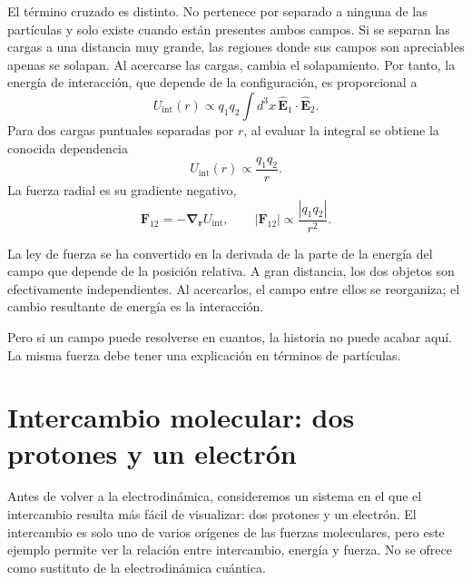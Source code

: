 El término cruzado es distinto. No pertenece por separado a ninguna de las partículas y solo existe cuando están presentes ambos campos. Si se separan las cargas a una distancia muy grande, las regiones donde sus campos son apreciables apenas se solapan. Al acercarse las cargas, cambia el solapamiento. Por tanto, la energía de interacción, que depende de la configuración, es proporcional a
\begin{equation}
U_{\text{int}}(r)\propto q_1q_2\int d^3x\,
\widehat{\mathbf E}_1\!\cdot\!\widehat{\mathbf E}_2.
\end{equation}
Para dos cargas puntuales separadas por \(r\), al evaluar la integral se obtiene la conocida dependencia
\begin{equation}
U_{\text{int}}(r)\propto\frac{q_1q_2}{r}.
\end{equation}
La fuerza radial es su gradiente negativo,
\begin{equation}
\mathbf F_{12}=-\boldsymbol\nabla_{\mathbf r}U_{\text{int}},
\qquad
|\mathbf F_{12}|\propto\frac{|q_1q_2|}{r^2}.
\end{equation}

La ley de fuerza se ha convertido en la derivada de la parte de la energía del campo que depende de la posición relativa. A gran distancia, los dos objetos son efectivamente independientes. Al acercarlos, el campo entre ellos se reorganiza; el cambio resultante de energía es la interacción.

Pero si un campo puede resolverse en cuantos, la historia no puede acabar aquí. La misma fuerza debe tener una explicación en términos de partículas.

\section{Intercambio molecular: dos protones y un electrón}

Antes de volver a la electrodinámica, consideremos un sistema en el que el intercambio resulta más fácil de visualizar: dos protones y un electrón. El intercambio es solo uno de varios orígenes de las fuerzas moleculares, pero este ejemplo permite ver la relación entre intercambio, energía y fuerza. No se ofrece como sustituto de la electrodinámica cuántica.


